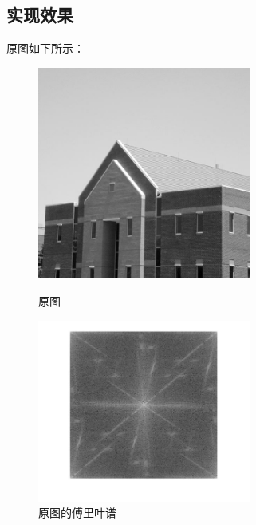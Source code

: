 \documentclass[11pt, a4paper, UTF8]{ctexart}
\begin{document}
 \subsection{实现效果}
原图如下所示：
\begin{figure}[H]
  \centering
  
  \begin{minipage}[t]{0.48\textwidth}
    \centering
    \includegraphics[width=7cm]{3_3.jpg}
    \caption{原图}
  \end{minipage}
  \begin{minipage}[t]{0.48\textwidth}
    \centering
    \includegraphics[width=7cm]{3_3_freq.jpg}
    \caption{原图的傅里叶谱}
  \end{minipage}  


\end{figure}
\end{document}
